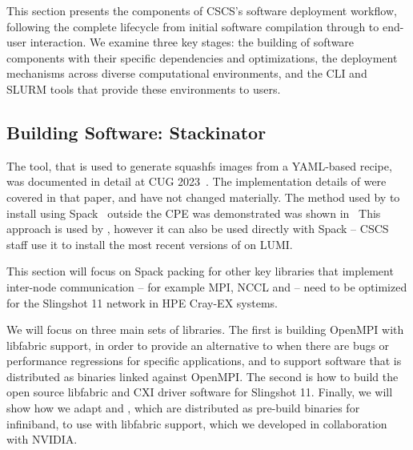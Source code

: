 This section presents the components of CSCS's software deployment workflow, following the complete lifecycle from initial software compilation through to end-user interaction.
We examine three key stages: the building of software components with their specific dependencies and optimizations, the deployment mechanisms across diverse computational environments, and the CLI and SLURM tools that provide these environments to users.

\subsection{Building Software: Stackinator}

The  \stackinator tool, that is used to generate squashfs images from a YAML-based recipe, was documented in detail at CUG 2023~\cite{uenv2023}.
The implementation details of \stackinator were covered in that paper, and have not changed materially.
The method used by \stackinator to install \craympich using Spack~\cite{gamblin:sc15} outside the CPE was demonstrated was shown in~\cite{uenv2023} 
This approach is used by \stackinator, however it can also be used directly with Spack -- CSCS staff use it to install the most recent versions of \craympich on LUMI.





This section will focus on Spack packing for other key libraries that implement inter-node communication -- for example MPI, NCCL and \nvshmem -- need to be optimized for the Slingshot 11 network in HPE Cray-EX systems.

We will focus on three main sets of libraries. The first is building OpenMPI with libfabric support, in order to provide an alternative to \craympich when there are bugs or performance regressions for specific applications, and to support software that is distributed as binaries linked against OpenMPI. The second is how to build the open source libfabric and CXI driver software for Slingshot 11. Finally, we will show how we adapt \cufftmp and \cusolvermp, which are distributed as pre-build binaries for infiniband, to use \nvshmem with libfabric support, which we developed in collaboration with NVIDIA.

